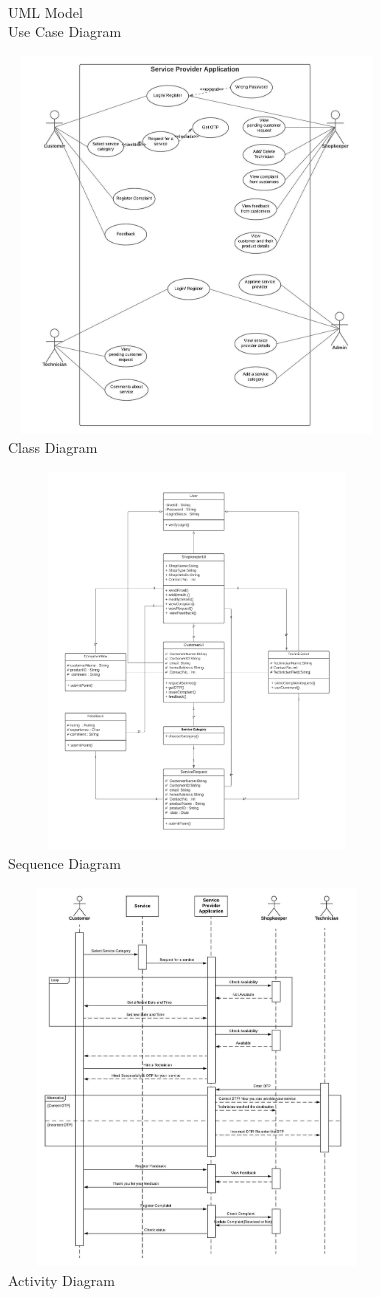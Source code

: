 \documentclass[conference]{IEEEtran}
\begin{document}
\\UML Model
\\Use Case Diagram
\graphicspath{ {./usecase/} }
\includegraphics[width=10cm , height=10cm]{usecase}
\\Class Diagram
\graphicspath{ {./class/} }
\includegraphics[width=10cm , height=10cm]{class}
\\Sequence Diagram
\graphicspath{ {./sequence/} }
\includegraphics[width=10cm , height=10cm]{sequence}
\\Activity Diagram
\end{document}
